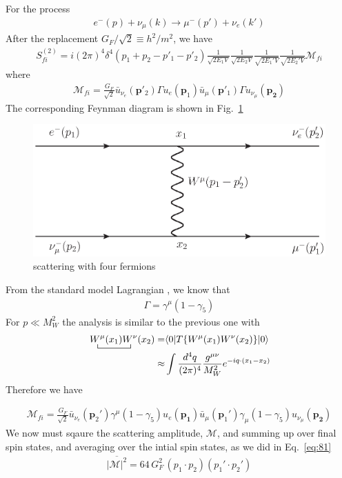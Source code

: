 For the process 
\begin{align}
  e^-(p)+\nu_\mu(k)\to\mu^-(p')+\nu_e(k')
\end{align}
After the replacement $G_F/\sqrt{2}\equiv h^2/m^2$, we have
\begin{align}
  \label{eq:101}
  S^{(2)}_{fi}=i(2\pi)^4\delta^{4}\left(p_1+p_2-p'_1-p'_2\right)
  \frac{1}{\sqrt{2E_1 V}}\frac{1}{\sqrt{2E_2 V}}
  \frac{1}{\sqrt{2E_1' V}}\frac{1}{\sqrt{2E_2' V}}
  \mathcal{M}_{fi}
\end{align}
where
\begin{align}
  \mathcal{M}_{fi}=\frac{G_F}{\sqrt{2}}
\bar{u}_{\nu_e}(\mathbf{p}'_2)\Gamma u_e(\mathbf{p}_1)\bar{u}_\mu(\mathbf{p}'_1)\Gamma u_{\nu_\mu}(\mathbf{p_2})
\end{align}
The corresponding Feynman diagram is shown in Fig.~\ref{fig:sw}
\begin{figure} %
  \centering %
  \includegraphics{scatteringw} %
  \caption{scattering with four fermions} %
  \label{fig:sw} %
\end{figure} %
From the standard model Lagrangian \cite{lsm}, we know that
\begin{align}
  \Gamma=\gamma^\mu(1-\gamma_5)
\end{align}
For $p\ll M_W^2$ the analysis is similar to the previous one with
\begin{align}
   \bcontraction{\,}{W^\mu}{(x_1)}{W^\nu}
\,W^\mu(x_1)W^\nu(x_2)=&\langle0|T\{W^\mu(x_1)W^\nu(x_2)\}|0\rangle\nonumber\\
\approx&\int\frac{d^4q}{(2\pi)^4}\frac{g^{\mu\nu}}{M_W^2}e^{-i q\cdot(x_1-x_2)}
\end{align}
Therefore we have

\begin{align}
  \mathcal{M}_{fi}=\frac{G_F}{\sqrt{2}}
\bar{u}_{\nu_e}(\mathbf{p}_2')\gamma^\mu(1-\gamma_5)u_e(\mathbf{p_1})
\bar{u}_\mu(\mathbf{p}_1')\gamma_\mu(1-\gamma_5)u_{\nu_\mu}(\mathbf{p_2})
\end{align}
We now must sqaure the scattering amplitude, $\mathcal{M}$, and summing up over final spin states, and averaging over the intial spin states, as we did in Eq.~\eqref{eq:81}
\begin{align}
  \label{eq:102}
  \overline{|\mathcal{M}|^2}=64\,G_F^2\,(p_1\cdot p_2)(p_1'\cdot p_2')
\end{align}

